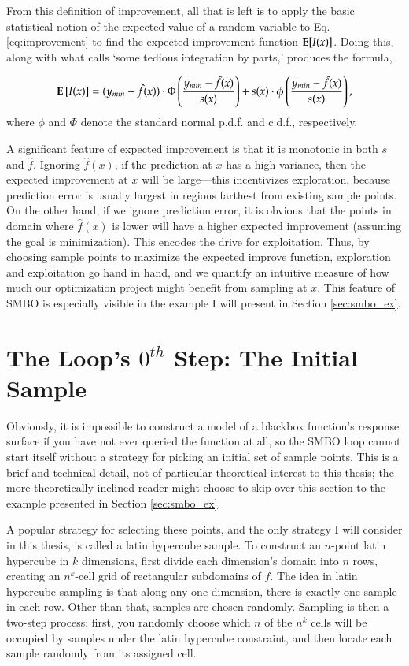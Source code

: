 From this definition of improvement, all that is left is to apply the basic statistical notion of the expected value of a random variable to Eq. \ref{eq:improvement} to find the expected improvement function $\mathbf{E}[I(x)]$. Doing this, along with what \cite{jones_efficient_1998} calls `some tedious integration by parts,' produces the formula,

\begin{equation} \label{eq:exp_improvement}
\mathbf{E}\left [I(x)\right ]=(y_{min}-\hat{f}(x))\cdot\Phi\left(\frac{y_{min}-\hat{f}(x)}{s(x)}\right) + s(x)\cdot\phi\left(\frac{y_{min}-\hat{f}(x)}{s(x)}\right),
\end{equation}
where $\phi$ and $\Phi$ denote the standard normal p.d.f. and c.d.f., respectively.

A significant feature of expected improvement is that it is monotonic in both $s$ and $\hat{f}$. Ignoring $\hat{f}(x)$, if the prediction at $x$ has a high variance, then the expected improvement at $x$ will be large---this incentivizes exploration, because prediction error is usually largest in regions farthest from existing sample points. On the other hand, if we ignore prediction error, it is obvious that the points in domain where $\hat{f}(x)$ is lower will have a higher expected improvement (assuming the goal is minimization). This encodes the drive for exploitation. Thus, by choosing sample points to maximize the expected improve function, exploration and exploitation go hand in hand, and we quantify an intuitive measure of how much our optimization project might benefit from sampling at $x$. This feature of SMBO is especially visible in the example I will present in Section \ref{sec:smbo_ex}.

\section{The Loop's $0^{th}$ Step: The Initial Sample}\label{sec:lh}

Obviously, it is impossible to construct a model of a blackbox function's response surface if you have not ever queried the function at all, so the SMBO loop cannot start itself without a strategy for picking an initial set of sample points. This is a brief and technical detail, not of particular theoretical interest to this thesis; the more theoretically-inclined reader might choose to skip over this section to the example presented in Section \ref{sec:smbo_ex}.

A popular strategy for selecting these points, and the only strategy I will consider in this thesis, is called a latin hypercube sample. To construct an $n$-point latin hypercube in $k$ dimensions, first divide each dimension's domain into $n$ rows, creating an $n^k$-cell grid of rectangular subdomains of $f$. The idea in latin hypercube sampling is that along any one dimension, there is exactly one sample in each row. Other than that, samples are chosen randomly. Sampling is then a two-step process: first, you randomly choose which $n$ of the $n^k$ cells will be occupied by samples under the latin hypercube constraint, and then locate each sample randomly from its assigned cell.



